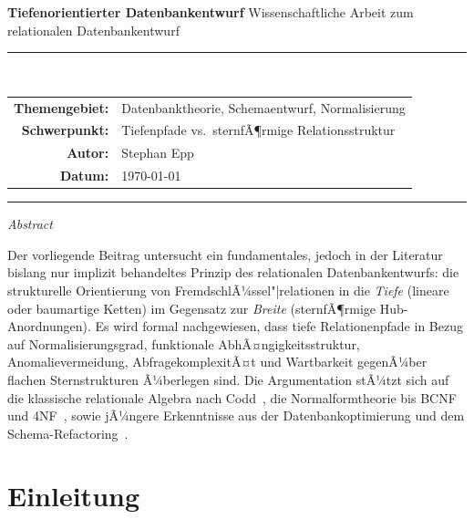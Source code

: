 ﻿\documentclass[12pt,a4paper]{article}
\theoremstyle{definition}
\theoremstyle{remark}
\begin{document}
\begin{titlepage}
  \centering
  \vspace*{2cm}
  {\LARGE\bfseries Tiefenorientierter Datenbankentwurf}
  \vspace{1.5cm}
  {\large Wissenschaftliche Arbeit zum relationalen Datenbankentwurf}
  \vspace{1.5cm}

  \rule{\textwidth}{0.4pt}\\[0.5em]
  \begin{tabular}{rl}
    \textbf{Themengebiet:} & Datenbanktheorie, Schemaentwurf, Normalisierung \\
    \textbf{Schwerpunkt:}  & Tiefenpfade vs.\ sternfÃ¶rmige Relationsstruktur \\
    \textbf{Autor:}        & Stephan Epp \\
    \textbf{Datum:}        & \today \\
  \end{tabular}
  \rule{\textwidth}{0.4pt}

  \vfill
  \textit{Abstract}\\[0.5em]
  \begin{minipage}{0.85\textwidth}
  \small
  Der vorliegende Beitrag untersucht ein fundamentales, jedoch in der Literatur
  bislang nur implizit behandeltes Prinzip des relationalen Datenbankentwurfs:
  die strukturelle Orientierung von FremdschlÃ¼ssel"|relationen in die
  \emph{Tiefe} (lineare oder baumartige Ketten) im Gegensatz zur
  \emph{Breite} (sternfÃ¶rmige Hub-Anordnungen). Es wird formal nachgewiesen,
  dass tiefe Relationenpfade in Bezug auf Normalisierungsgrad, funktionale
  AbhÃ¤ngigkeitsstruktur, Anomalievermeidung, AbfragekomplexitÃ¤t und
  Wartbarkeit gegenÃ¼ber flachen Sternstrukturen Ã¼berlegen sind. Die Argumentation
  stÃ¼tzt sich auf die klassische relationale Algebra nach Codd~\cite{Codd1970},
  die Normalformtheorie bis BCNF und 4NF~\cite{Codd1974, Fagin1977}, sowie
  jÃ¼ngere Erkenntnisse aus der Datenbankoptimierung und dem Schema-Refactoring~\cite{Ambler2003}.
  \end{minipage}
\end{titlepage}

\tableofcontents
\newpage

\section{Einleitung}
\label{sec:einleitung}
\end{document}
